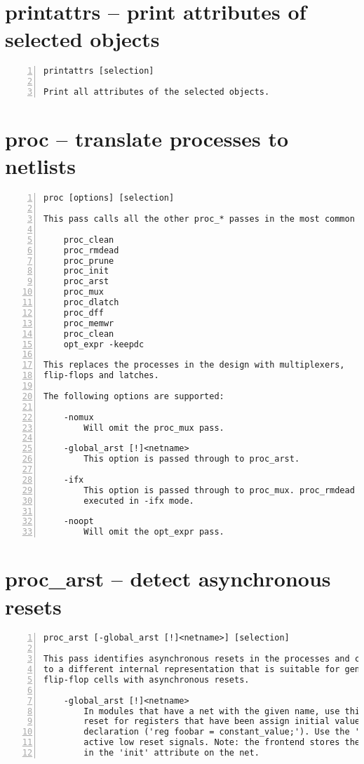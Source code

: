 \section{printattrs -- print attributes of selected objects}
\label{cmd:printattrs}
\begin{lstlisting}[numbers=left,frame=single]
    printattrs [selection]

Print all attributes of the selected objects.
\end{lstlisting}

\section{proc -- translate processes to netlists}
\label{cmd:proc}
\begin{lstlisting}[numbers=left,frame=single]
    proc [options] [selection]

This pass calls all the other proc_* passes in the most common order.

    proc_clean
    proc_rmdead
    proc_prune
    proc_init
    proc_arst
    proc_mux
    proc_dlatch
    proc_dff
    proc_memwr
    proc_clean
    opt_expr -keepdc

This replaces the processes in the design with multiplexers,
flip-flops and latches.

The following options are supported:

    -nomux
        Will omit the proc_mux pass.

    -global_arst [!]<netname>
        This option is passed through to proc_arst.

    -ifx
        This option is passed through to proc_mux. proc_rmdead is not
        executed in -ifx mode.

    -noopt
        Will omit the opt_expr pass.
\end{lstlisting}

\section{proc\_arst -- detect asynchronous resets}
\label{cmd:proc_arst}
\begin{lstlisting}[numbers=left,frame=single]
    proc_arst [-global_arst [!]<netname>] [selection]

This pass identifies asynchronous resets in the processes and converts them
to a different internal representation that is suitable for generating
flip-flop cells with asynchronous resets.

    -global_arst [!]<netname>
        In modules that have a net with the given name, use this net as async
        reset for registers that have been assign initial values in their
        declaration ('reg foobar = constant_value;'). Use the '!' modifier for
        active low reset signals. Note: the frontend stores the default value
        in the 'init' attribute on the net.
\end{lstlisting}

